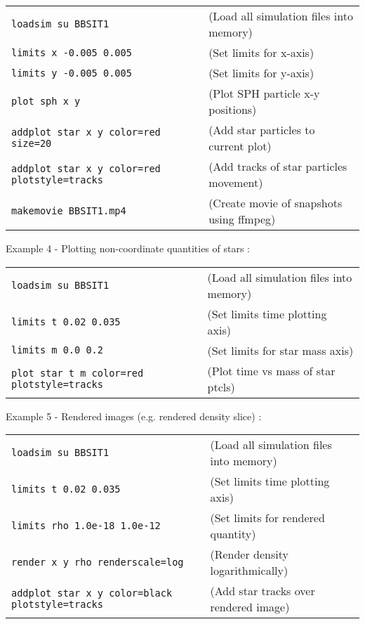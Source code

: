 \documentclass[a4paper]{article}
\newcommand{\var}[1]{\texttt{#1}}
\begin{document}
\begin{tabular}{p{7cm}p{6cm}}
\var{loadsim su BBSIT1} &               (Load all simulation files into memory) \\
\var{limits x -0.005 0.005} &           (Set limits for x-axis) \\
\var{limits y -0.005 0.005} &           (Set limits for y-axis) \\
\var{plot sph x y} &                    (Plot SPH particle x-y positions) \\
\var{addplot star x y color=red size=20} &  (Add star particles to current plot) \\
\var{addplot star x y color=red plotstyle=tracks} &            (Add tracks of star particles movement) \\
    
\var{makemovie BBSIT1.mp4} &             (Create movie of snapshots using ffmpeg)
\end{tabular}
\newline


\noindent Example 4 - Plotting non-coordinate quantities of stars : \\

\begin{tabular}{p{7cm}p{6cm}}
\var{loadsim su BBSIT1} &               (Load all simulation files into memory) \\
\var{limits t 0.02 0.035} &                    (Set limits time plotting axis) \\
\var{limits m 0.0 0.2} &                      (Set limits for star mass axis) \\
\var{plot star t m color=red plotstyle=tracks} & (Plot time vs mass of star ptcls)     
\end{tabular}
\newline


\noindent Example 5 - Rendered images (e.g. rendered density slice) : \\

\begin{tabular}{p{7cm}p{6cm}}
\var{loadsim su BBSIT1} &       (Load all simulation files into memory) \\
\var{limits t 0.02 0.035} &            (Set limits time plotting axis) \\
\var{limits rho 1.0e-18 1.0e-12} &     (Set limits for rendered quantity) \\
\var{render x y rho renderscale=log} & (Render density logarithmically) \\
\var{addplot star x y color=black plotstyle=tracks} & (Add star tracks over rendered image)
\end{tabular}
\newline
\end{document}
